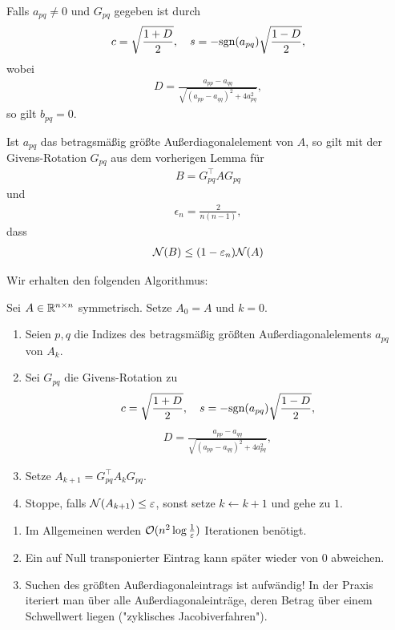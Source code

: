 \documentclass{report}
\begin{document}
	\begin{lemma}
		Falls $a_{pq} \neq 0$ und $G_{pq}$ gegeben ist durch 
		\begin{align*}
			c = \sqrt{\frac{1 + D}{2}}, \quad s = -\textnormal{sgn}(a_{pq})\sqrt{\frac{1-D}{2}},
		\end{align*} wobei
		\begin{align*}
			D = \frac{a_{pp} - a_{qq}}{\sqrt{(a_{pp} - a_{qq})^2 + 4a_{pq}^2}},
		\end{align*}
		so gilt $b_{pq} = 0$.
	\end{lemma}
	\begin{theorem}
		Ist $a_{pq}$ das betragsmäßig größte Außerdiagonalelement von $A$, so gilt mit der Givens-Rotation $G_{pq}$ aus dem vorherigen Lemma für
		\begin{align*}
			B = G_{pq}^\top A G_{pq}
		\end{align*}
		und 
		\begin{align*}
			\epsilon_n = \frac{2}{n(n-1)},
		\end{align*}
		dass
		\begin{align*}
			\mathcal{N}(B) \leq (1 - \varepsilon_n)\mathcal{N}(A)
		\end{align*}
	\end{theorem}
	Wir erhalten den folgenden Algorithmus:
	\begin{theorem}
		Sei $A \in \mathbb{R}^{n \times n}$ symmetrisch. Setze $A_0 = A$ und $k = 0$.
		\begin{enumerate}
			\item Seien $p,q$ die Indizes des betragsmäßig größten Außerdiagonalelements $a_{pq}$ von $A_k$.
			\item Sei $G_{pq}$ die Givens-Rotation zu
			\begin{align*}
				c = \sqrt{\frac{1 + D}{2}}, \quad s = -\textnormal{sgn}(a_{pq})\sqrt{\frac{1-D}{2}},
			\end{align*}
			\begin{align*}
				D = \frac{a_{pp} - a_{qq}}{\sqrt{(a_{pp} - a_{qq})^2 + 4a_{pq}^2}},
			\end{align*}
			\item Setze $A_{k+1} = G^\top_{pq}A_kG_{pq}$.
			\item Stoppe, falls $\mathcal{N}(A_{k+1}) \leq \varepsilon$, sonst setze $k \gets k+1$ und gehe zu $1$.
		\end{enumerate}
	\end{theorem}
	\begin{proposition}
		\begin{enumerate}
			\item Im Allgemeinen werden $\mathcal{O}(n^2 \log \frac{1}{\varepsilon})$ Iterationen benötigt.
			\item Ein auf Null transponierter Eintrag kann später wieder von $0$ abweichen.
			\item Suchen des größten Außerdiagonaleintrags ist aufwändig! In der Praxis iteriert man über alle Außerdiagonaleinträge, deren Betrag über einem Schwellwert liegen ("zyklisches Jacobiverfahren").        
		\end{enumerate}
	\end{proposition}
\end{document}
